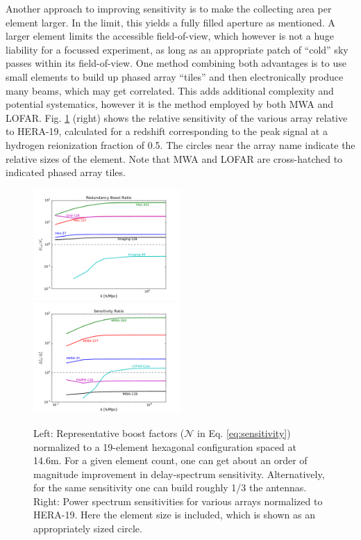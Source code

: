 \documentclass[preprint,11pt]{aastex}
\begin{document}
Another approach to improving sensitivity is to make the collecting area per element larger.  In the limit, this yields a fully filled aperture as mentioned.  A larger element limits the accessible field-of-view, which however is not a huge liability for a focussed experiment, as long as an appropriate patch of ``cold'' sky passes within its field-of-view.  One method combining both advantages is to use small elements to build up phased array ``tiles'' and then electronically produce many beams, which may get correlated.  This adds additional complexity and potential systematics, however it is the method employed by both MWA and LOFAR.  Fig. \ref{fig:boost} (right) shows the relative sensitivity of the various array relative to HERA-19, calculated for a redshift corresponding to the peak signal at a hydrogen reionization fraction of 0.5.  The circles near the array name indicate the relative sizes of the element.  Note that MWA and LOFAR are cross-hatched to indicated phased array tiles.


\begin{figure}[h!]
\centerline{
\includegraphics[width=0.5\textwidth]{plots/boost.pdf}
\includegraphics[width=0.5\textwidth]{plots/sensratio.pdf}
}
\caption{Left: Representative boost factors ($\mathcal{N}$ in Eq. \ref{eq:sensitivity}) normalized to a 19-element hexagonal configuration spaced at 14.6m.  For a given element count, one can get about an order of
magnitude improvement in delay-spectrum sensitivity.  Alternatively, for the same sensitivity one can build roughly 1/3 the antennas.  Right:  Power spectrum sensitivities for various arrays normalized to HERA-19.  Here the element size is included, which is shown as an appropriately sized circle.}
\label{fig:boost}
\end{figure}
\end{document}

